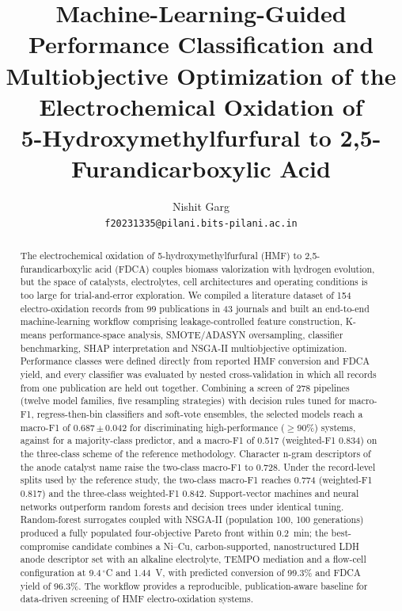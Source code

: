 \documentclass[10pt,a4paper]{article}
\title{\textbf{Machine-Learning-Guided Performance Classification and\\
Multiobjective Optimization of the Electrochemical Oxidation of\\
5-Hydroxymethylfurfural to 2,5-Furandicarboxylic Acid}}
\author{Nishit Garg\\[2pt]
\small \texttt{f20231335@pilani.bits-pilani.ac.in}}
\date{}
\newcommand{\degC}{\ensuremath{^{\circ}}C}
\newcommand{\FoneCtwo}{0.687}        \newcommand{\FoneCtwoSD}{0.042}
\newcommand{\FoneCthreeP}{0.517}     \newcommand{\FoneCthreePSD}{0.040}
\newcommand{\FoneCthreePW}{0.834}    \newcommand{\BaseCthreeP}{0.310}
\newcommand{\FoneCtwoText}{0.728}    \newcommand{\FoneCtwoTextSD}{0.028}
\newcommand{\RecCtwo}{0.774}         \newcommand{\RecCtwoW}{0.817}
\newcommand{\RecCthreePW}{0.842}
\begin{document}
\maketitle

\begin{abstract}
\noindent
The electrochemical oxidation of 5-hydroxymethylfurfural (HMF) to
2,5-furandicarboxylic acid (FDCA) couples biomass valorization with hydrogen
evolution, but the space of catalysts, electrolytes, cell architectures and
operating conditions is too large for trial-and-error exploration. We compiled
a literature dataset of 154 electro-oxidation records from 99 publications in
43 journals and built an end-to-end machine-learning workflow comprising
leakage-controlled feature construction, K-means performance-space analysis,
SMOTE/ADASYN oversampling, classifier benchmarking, SHAP interpretation and
NSGA-II multiobjective optimization. Performance classes were defined directly
from reported HMF conversion and FDCA yield, and every classifier was evaluated
by nested cross-validation in which all records from one publication are held
out together. Combining a screen of 278 pipelines (twelve model families, five
resampling strategies) with decision rules tuned for macro-F1, regress-then-bin
classifiers and soft-vote ensembles, the selected models reach a macro-F1 of
\FoneCtwo{}\,$\pm$\,\FoneCtwoSD{} for discriminating high-performance
($\geq$90\%) systems, against \BaseCtwo{} for a majority-class predictor, and a
macro-F1 of \FoneCthreeP{} (weighted-F1 \FoneCthreePW{}) on the three-class
scheme of the reference methodology. Character n-gram descriptors of the anode
catalyst name raise the two-class macro-F1 to \FoneCtwoText{}. Under the
record-level splits used by the reference study, the two-class macro-F1 reaches
\RecCtwo{} (weighted-F1 \RecCtwoW{}) and the three-class weighted-F1
\RecCthreePW{}. Support-vector machines and neural networks outperform random
forests and decision trees under identical tuning. Random-forest surrogates coupled with
NSGA-II (population 100, 100 generations) produced a fully populated
four-objective Pareto front within 0.2~min; the best-compromise candidate
combines a Ni--Cu, carbon-supported, nanostructured LDH anode descriptor set
with an alkaline  electrolyte, TEMPO mediation and a flow-cell
configuration at 9.4\,\degC{} and 1.44~V, with predicted conversion of 99.3\%
and FDCA yield of 96.3\%. The workflow provides a reproducible, publication-aware
baseline for data-driven screening of HMF electro-oxidation systems.
\end{abstract}
\end{document}
